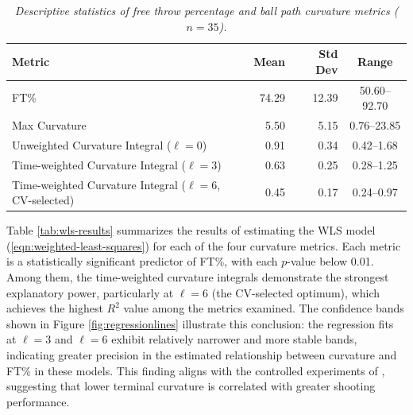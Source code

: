 \documentclass{article}
\begin{document}
    \begin{table}[H]
        \centering
        \begin{tabular}{lrrc}
        \toprule
        \textbf{Metric} & \textbf{Mean} & \textbf{Std Dev} & \textbf{Range} \\
        \midrule
        FT\% & 74.29 & 12.39 & 50.60--92.70 \\
        Max Curvature & 5.50 & 5.15 & 0.76--23.85 \\
        Unweighted Curvature Integral ($\ell=0$) & 0.91 & 0.34 & 0.42--1.68 \\
        Time-weighted Curvature Integral ($\ell=3$) & 0.63 & 0.25 & 0.28--1.25 \\
        Time-weighted Curvature Integral ($\ell=6$, CV-selected) & 0.45 & 0.17 & 0.24--0.97 \\ %
        \bottomrule
        \end{tabular}
        \caption{\it Descriptive statistics of free throw percentage and ball path curvature metrics ($n = 35$).}
        \label{tab:summary-stats}
    \end{table}

    Table \ref{tab:wls-results} summarizes the results of estimating the WLS model (\ref{eqn:weighted-least-squares}) for each of the four curvature metrics. Each metric is a statistically significant predictor of FT\%, with each $p$-value below 0.01. Among them, the time-weighted curvature integrals demonstrate the strongest explanatory power, particularly at $\ell = 6$ (the CV-selected optimum), which achieves the highest $R^2$ value among the metrics examined. The confidence bands shown in Figure \ref{fig:regressionlines} illustrate this conclusion: the regression fits at $\ell = 3$ and $\ell = 6$ exhibit relatively narrower and more stable bands, indicating greater precision in the estimated relationship between curvature and FT\% in these models. This finding aligns with the controlled experiments of \citet{slegers_role_2024}, suggesting that lower terminal curvature is correlated with greater shooting performance.
\end{document}
